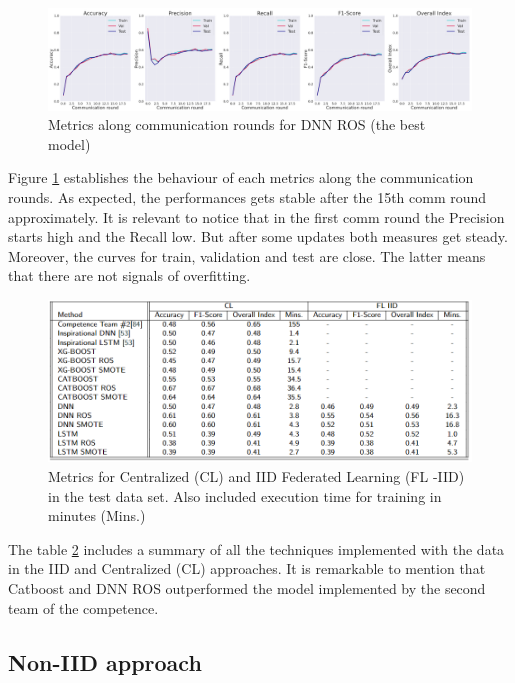 \begin{figure}[H]
\centering
\includegraphics[scale=0.4]{img/comm_round_metrics_DNNROS.png}
\caption{Metrics along communication rounds for DNN ROS (the best model)}
\label{fig:comm_round_metrics_DNNROS}
\end{figure}

Figure \ref{fig:comm_round_metrics_DNNROS} establishes the behaviour of each metrics along the communication rounds. As expected, the performances gets stable after the 15th comm round approximately. It is relevant to notice that in the first comm round the Precision starts high and the Recall low. But after some updates both measures get steady. Moreover, the curves for train, validation and test are close. The latter means that there are not signals of overfitting.


\begin{figure}[H]
\centering
\includegraphics[scale=0.55]{img/metrics_CL_FLIID.png}
\caption{Metrics for Centralized (CL) and IID Federated Learning (FL -IID) in the test data set. Also included execution time for  training in minutes (Mins.)}
\label{figure:metrics_CL_FLIID}
\end{figure}

The table \ref{figure:metrics_CL_FLIID} includes a summary of all the techniques implemented with the data in the IID and Centralized (CL) approaches. It is remarkable to mention that Catboost and DNN ROS outperformed the model implemented by the second team of the competence.

\subsection{Non-IID approach}

